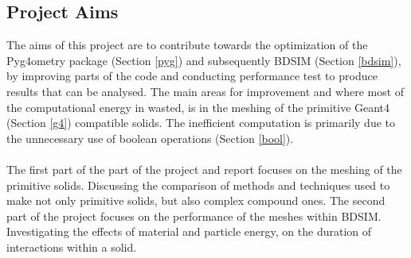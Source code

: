 \documentclass[12pt,a4paper]{article}
\begin{document}
\subsection{Project Aims}
\label{aim}
The aims of this project are to contribute towards the optimization of the Pyg4ometry package (Section \ref{pyg}) and subsequently BDSIM (Section \ref{bdsim}), by improving parts of the code and conducting performance test to produce results that can be analysed. The main areas for improvement and where most of the computational energy in wasted, is in the meshing of the primitive Geant4 (Section \ref{g4}) compatible solids. The inefficient computation is primarily due to the unnecessary use of boolean operations (Section \ref{bool}).
\\\\
The first part of the part of the project and report focuses on the meshing of the primitive solids. Discussing the comparison of methods and techniques used to make not only primitive solids, but also complex compound ones. The second part of the project focuses on the performance of the meshes within BDSIM. Investigating the effects of material and particle energy, on the duration of interactions within a solid.


\end{document}
